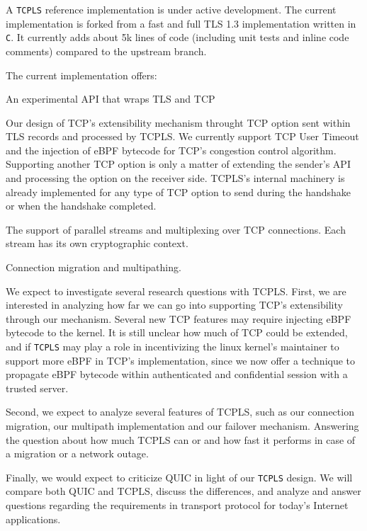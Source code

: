 
A \texttt{TCPLS} reference implementation is under active development. The
current implementation is forked from a fast and full
TLS 1.3 implementation written in \texttt{C}. It currently adds about 5k lines
of code (including unit tests and inline code comments) compared to the upstream branch.

The current implementation offers:
\begin{inparaenum}
  \item An experimental API that wraps TLS and TCP
  \item Our design of TCP's extensibility mechanism throught TCP option sent
within TLS records and processed by TCPLS. We currently support TCP User
Timeout and the injection of eBPF bytecode for TCP's congestion control
algorithm. Supporting another TCP option is only a matter of extending the sender's
API and processing the option
on the receiver side. TCPLS's internal machinery is already implemented for any
type of TCP option to send during the handshake or when the handshake completed.
  \item The support of parallel streams and multiplexing over TCP connections.
    Each stream has its own cryptographic context.
  \item Connection migration and multipathing.
\end{inparaenum}

We expect to investigate several research questions with TCPLS. First, we are
interested in analyzing how far we can go into supporting TCP's extensibility
through our mechanism. Several new TCP features may require injecting eBPF
bytecode to the kernel. It is still unclear how much of TCP could be extended,
and if \texttt{TCPLS} may play a role in incentivizing the linux kernel's maintainer
to support more eBPF in TCP's implementation, since we now offer a technique to
propagate eBPF bytecode within authenticated and confidential session with a
trusted server.

Second, we expect to analyze several features of TCPLS, such as our
connection migration, our multipath implementation and our failover mechanism.
Answering the question about how much TCPLS can or and how fast it performs in
case of a migration or a network outage.

Finally, we would expect to criticize QUIC in light of our \texttt{TCPLS}
design. We will compare both QUIC and TCPLS, discuss the differences, and analyze
and answer questions regarding the requirements in transport protocol for today's
Internet applications.
